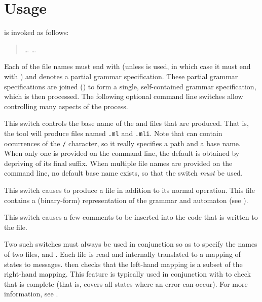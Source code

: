 \documentclass[onecolumn,11pt,nocopyrightspace,preprint]{sigplanconf}
\begin{document}

\section{Usage}

\menhir is invoked as follows:
\begin{quote}
\cmenhir {} \ldots {}  \ldots {}
\end{quote}
Each of the file names must end with \mly (unless \ocoq is used,
in which case it must end with \vy) and denotes a partial
grammar specification. These partial grammar specifications are joined
() to form a single, self-contained grammar specification,
which is then processed. The following optional command line switches allow
controlling many aspects of the process.

 This switch controls the base name
of the \ml and \mli files that are produced. That is, the tool will produce
files named \texttt{.ml} and \texttt{.mli}. Note
that  can contain occurrences of the \texttt{/} character, so it
really specifies a path and a base name. When only one  is
provided on the command line, the default  is obtained by
depriving  of its final \mly suffix. When multiple file
names are provided on the command line, no default base name exists, so that
the \obase switch \emph{must} be used.

\docswitch{\ocmly} This switch causes \menhir to produce a \cmly file in
addition to its normal operation. This file contains a (binary-form)
representation of the grammar and automaton (see ).

\docswitch{\ocomment} This switch causes a few comments to be inserted into the
\ocaml code that is written to the \ml file.

 Two
such switches must always be used in conjunction so as to specify the names of
two \messages files,  and . Each file is read and
internally translated to a mapping of states to messages. \menhir then checks
that the left-hand mapping is a subset of the right-hand mapping. This feature
is typically used in conjunction with \olisterrors to check that 
is complete (that is, covers all states where an error can occur).
For more information, see .
\end{document}
